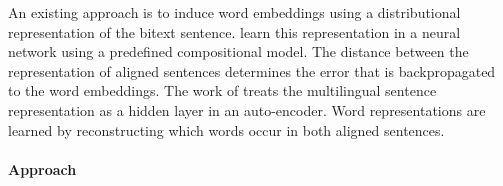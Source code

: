 \documentclass[a4paper,11pt]{article}
\begin{document}

An existing approach is to induce word embeddings using a distributional representation of the bitext sentence. 
\cite{hermann2014multilingual} learn this representation in a neural network using a predefined compositional model. The distance between the representation of aligned sentences determines the error that is backpropagated to the word embeddings.
The work of \cite{sarath2014autoencoder} treats the multilingual sentence representation as a hidden layer in an auto-encoder. Word representations are learned by reconstructing which words occur in both aligned sentences. 





\paragraph{Approach}
\end{document}
